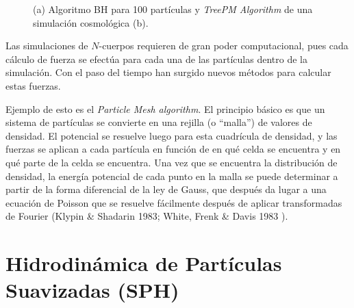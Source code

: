 \documentclass[a4paper,openright,12pt]{book}
\begin{document}
\begin{figure}
\centering
  \caption{\footnotesize{(a) Algoritmo BH para 100 partículas y \textit{TreePM Algorithm} de una simulación cosmológica (b).}}
  \label{fig 2.1}
\end{figure}

Las simulaciones de $N$-cuerpos requieren de gran poder computacional, pues cada cálculo de fuerza se efectúa para cada una de las partículas dentro de la simulación. Con el paso del tiempo han surgido nuevos métodos para calcular estas fuerzas. 

Ejemplo de esto es el \textit{Particle Mesh algorithm}. El principio básico es que un sistema de partículas se convierte en una rejilla (o ``malla'') de valores de densidad. El potencial se resuelve luego para esta cuadrícula de densidad, y las fuerzas se aplican a cada partícula en función de en qué celda se encuentra y en qué parte de la celda se encuentra. Una vez que se encuentra la distribución de densidad, la energía potencial de cada punto en la malla se puede determinar a partir de la forma diferencial de la ley de Gauss, que después da lugar a una ecuación de Poisson que se resuelve fácilmente después de aplicar transformadas de Fourier (Klypin \& Shadarin 1983; White, Frenk \& Davis 1983 \cite{b5.1, b5.2}).




\section{Hidrodinámica de Partículas Suavizadas (SPH)}
\end{document}
